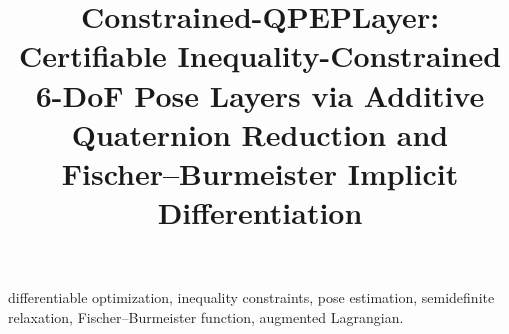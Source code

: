 \documentclass[conference]{IEEEtran}
\begin{document}
\title{Constrained-QPEPLayer: Certifiable Inequality-Constrained 6-DoF Pose Layers via Additive Quaternion Reduction and Fischer--Burmeister Implicit Differentiation}

\author{
}

\maketitle

\begin{abstract}

\end{abstract}

\begin{IEEEkeywords}
differentiable optimization, inequality constraints, pose estimation, semidefinite relaxation, Fischer--Burmeister function, augmented Lagrangian.
\end{IEEEkeywords}









\clearpage
\appendix


\clearpage


\end{document}
